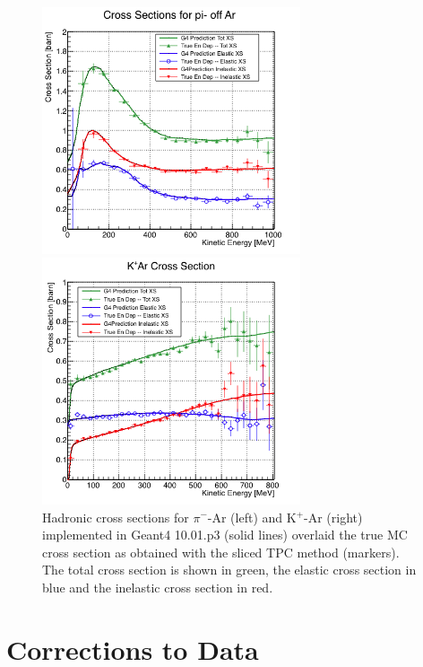 \begin{figure}
\begin{minipage}[b]{.53\textwidth}  
  \centering  
\includegraphics[width=3in]{Chapter-4/Images/PionTrueXS.png}
\end{minipage}%
\begin{minipage}[b]{0.53\textwidth}  
  \centering  
\includegraphics[width=3in]{Chapter-4/Images/KaonTrueXS.png}
\end{minipage}
\caption{Hadronic cross sections for $\pi^-$-Ar (left) and K$^+$-Ar (right) implemented in Geant4 10.01.p3 (solid lines) overlaid the true MC cross section as obtained with the sliced TPC method (markers). The total cross section is shown in green,  the elastic cross section in blue and the inelastic cross section in red.}
\label{fig:TrueMCXS2}
\end{figure}


\section{Corrections to Data}\label{ch:MCCorrections}


